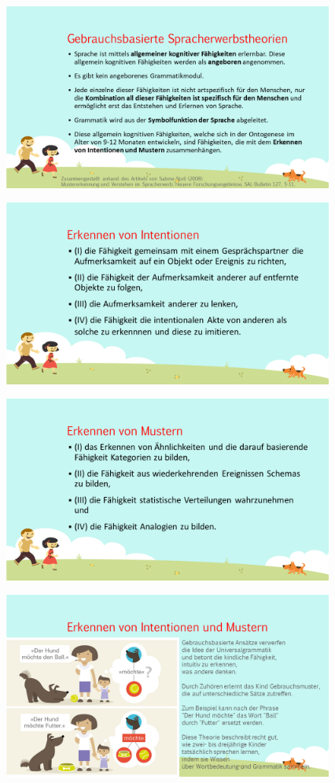 \documentclass[
  letterpaper,
]{scrbook}
\begin{document}
\includegraphics[width=4.27in,height=\textheight]{./pictures/muster_intentionen/Diapozitiv5.PNG}

\includegraphics[width=4.27in,height=\textheight]{./pictures/muster_intentionen/Diapozitiv6.PNG}

\includegraphics[width=4.27in,height=\textheight]{./pictures/muster_intentionen/Diapozitiv7.PNG}

\includegraphics[width=4.27in,height=\textheight]{./pictures/muster_intentionen/Diapozitiv8.PNG}
\end{document}
